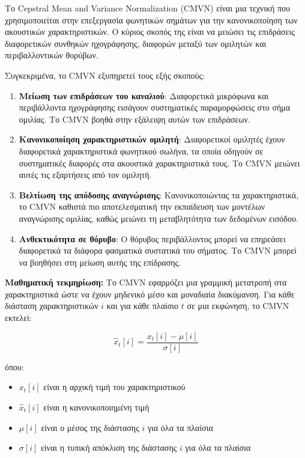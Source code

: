 \documentclass[a4paper,12pt]{article}
\begin{document}
Το Cepstral Mean and Variance Normalization (CMVN) είναι μια τεχνική που χρησιμοποιείται στην επεξεργασία φωνητικών σημάτων για την κανονικοποίηση των ακουστικών χαρακτηριστικών. Ο κύριος σκοπός της είναι να μειώσει τις επιδράσεις διαφορετικών συνθηκών ηχογράφησης, διαφορών μεταξύ των ομιλητών και περιβαλλοντικών θορύβων.

Συγκεκριμένα, το CMVN εξυπηρετεί τους εξής σκοπούς:

\begin{enumerate}
    \item \textbf{Μείωση των επιδράσεων του καναλιού}: Διαφορετικά μικρόφωνα και περιβάλλοντα ηχογράφησης εισάγουν συστηματικές παραμορφώσεις στο σήμα ομιλίας. Το CMVN βοηθά στην εξάλειψη αυτών των επιδράσεων.
    
    \item \textbf{Κανονικοποίηση χαρακτηριστικών ομιλητή}: Διαφορετικοί ομιλητές έχουν διαφορετικά χαρακτηριστικά φωνητικού σωλήνα, τα οποία οδηγούν σε συστηματικές διαφορές στα ακουστικά χαρακτηριστικά τους. Το CMVN μειώνει αυτές τις εξαρτήσεις από τον ομιλητή.
    
    \item \textbf{Βελτίωση της απόδοσης αναγνώρισης}: Κανονικοποιώντας τα χαρακτηριστικά, το CMVN καθιστά πιο αποτελεσματική την εκπαίδευση των μοντέλων αναγνώρισης ομιλίας, καθώς μειώνει τη μεταβλητότητα των δεδομένων εισόδου.
    
    \item \textbf{Ανθεκτικότητα σε θόρυβο}: Ο θόρυβος περιβάλλοντος μπορεί να επηρεάσει διαφορετικά τα διάφορα φασματικά συστατικά του σήματος. Το CMVN μπορεί να βοηθήσει στη μείωση αυτής της επίδρασης.
\end{enumerate}

\textbf{Μαθηματική τεκμηρίωση:}
Το CMVN εφαρμόζει μια γραμμική μετατροπή στα χαρακτηριστικά ώστε να έχουν μηδενικό μέσο και μοναδιαία διακύμανση. Για κάθε διάσταση χαρακτηριστικών $i$ και για κάθε πλαίσιο $t$ σε μια εκφώνηση, το CMVN εκτελεί:

\begin{equation}
\hat{x}_t[i] = \frac{x_t[i] - \mu[i]}{\sigma[i]}
\end{equation}

όπου:
\begin{itemize}
    \item $x_t[i]$ είναι η αρχική τιμή του χαρακτηριστικού
    \item $\hat{x}_t[i]$ είναι η κανονικοποιημένη τιμή
    \item $\mu[i]$ είναι ο μέσος της διάστασης $i$ για όλα τα πλαίσια
    \item $\sigma[i]$ είναι η τυπική απόκλιση της διάστασης $i$ για όλα τα πλαίσια
\end{itemize}
\end{document}
